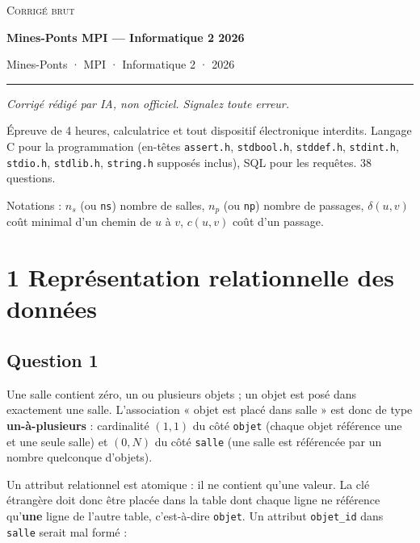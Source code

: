 \documentclass[11pt,a4paper]{article}
\begin{document}
\thispagestyle{plain}
\begin{center}
  {\small\scshape Corrigé brut}\par\smallskip
  {\LARGE\bfseries Mines-Ponts MPI — Informatique 2 2026\par}\medskip
  {\large Mines-Ponts · MPI · Informatique 2 · 2026\par}
\end{center}
\vspace{2pt}\hrule\vspace{8pt}

\emph{Corrigé rédigé par IA, non officiel. Signalez toute erreur.}

Épreuve de 4 heures, calculatrice et tout dispositif électronique interdits. Langage C pour la programmation (en-têtes \texttt{assert.h}, \texttt{stdbool.h}, \texttt{stddef.h}, \texttt{stdint.h}, \texttt{stdio.h}, \texttt{stdlib.h}, \texttt{string.h} supposés inclus), SQL pour les requêtes. 38 questions.

Notations : \(n_s\) (ou \texttt{ns}) nombre de salles, \(n_p\) (ou \texttt{np}) nombre de passages, \(\delta(u,v)\) coût minimal d'un chemin de \(u\) à \(v\), \(c(u,v)\) coût d'un passage.

\hypertarget{repruxe9sentation-relationnelle-des-donnuxe9es}{%
\section{1 Représentation relationnelle des données}\label{repruxe9sentation-relationnelle-des-donnuxe9es}}

\hypertarget{question-1}{%
\subsection{Question 1}\label{question-1}}

Une salle contient zéro, un ou plusieurs objets ; un objet est posé dans exactement une salle. L'association « objet est placé dans salle » est donc de type \textbf{un-à-plusieurs} : cardinalité \((1,1)\) du côté \texttt{objet} (chaque objet référence une et une seule salle) et \((0,N)\) du côté \texttt{salle} (une salle est référencée par un nombre quelconque d'objets).

Un attribut relationnel est atomique : il ne contient qu'une valeur. La clé étrangère doit donc être placée dans la table dont chaque ligne ne référence qu'\textbf{une} ligne de l'autre table, c'est-à-dire \texttt{objet}. Un attribut \texttt{objet\_id} dans \texttt{salle} serait mal formé :
\end{document}
